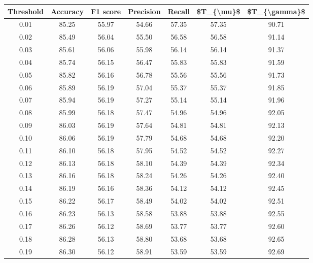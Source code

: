 \begin{tabular}{|c|c|c|c|c|c|c|}
\hline
 Threshold &  Accuracy &  F1 score &  Precision &  Recall &  \$T\_\{\textbackslash mu\}\$ &  \$T\_\{\textbackslash gamma\}\$ \\
\hline
      0.01 &     85.25 &     55.97 &      54.66 &   57.35 &      57.35 &         90.71 \\
      0.02 &     85.49 &     56.04 &      55.50 &   56.58 &      56.58 &         91.14 \\
      0.03 &     85.61 &     56.06 &      55.98 &   56.14 &      56.14 &         91.37 \\
      0.04 &     85.74 &     56.15 &      56.47 &   55.83 &      55.83 &         91.59 \\
      0.05 &     85.82 &     56.16 &      56.78 &   55.56 &      55.56 &         91.73 \\
      0.06 &     85.89 &     56.19 &      57.04 &   55.37 &      55.37 &         91.85 \\
      0.07 &     85.94 &     56.19 &      57.27 &   55.14 &      55.14 &         91.96 \\
      0.08 &     85.99 &     56.18 &      57.47 &   54.96 &      54.96 &         92.05 \\
      0.09 &     86.03 &     56.19 &      57.64 &   54.81 &      54.81 &         92.13 \\
      0.10 &     86.06 &     56.19 &      57.79 &   54.68 &      54.68 &         92.20 \\
      0.11 &     86.10 &     56.18 &      57.95 &   54.52 &      54.52 &         92.27 \\
      0.12 &     86.13 &     56.18 &      58.10 &   54.39 &      54.39 &         92.34 \\
      0.13 &     86.16 &     56.18 &      58.24 &   54.26 &      54.26 &         92.40 \\
      0.14 &     86.19 &     56.16 &      58.36 &   54.12 &      54.12 &         92.45 \\
      0.15 &     86.22 &     56.17 &      58.49 &   54.02 &      54.02 &         92.51 \\
      0.16 &     86.23 &     56.13 &      58.58 &   53.88 &      53.88 &         92.55 \\
      0.17 &     86.26 &     56.12 &      58.69 &   53.77 &      53.77 &         92.60 \\
      0.18 &     86.28 &     56.13 &      58.80 &   53.68 &      53.68 &         92.65 \\
      0.19 &     86.30 &     56.12 &      58.91 &   53.59 &      53.59 &         92.69 \\

\end{tabular}
